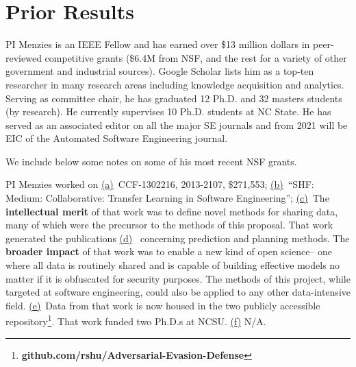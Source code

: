  \section{Prior Results}\label{sec:PriorResults}

PI Menzies is an IEEE Fellow and has earned over \$13 million dollars in peer-reviewed competitive grants (\$6.4M from NSF, and  the rest for a variety of other government and industrial sources).
Google Scholar lists him as a top-ten researcher in many research areas including knowledge acquisition and analytics. Serving as committee chair, he has graduated 12 Ph.D. and 32 masters students (by research). He currently supervises 10 Ph.D. students at NC State. He has served as an associated editor on all the major SE journals and from 2021 will be EIC of the Automated Software Engineering journal. 


 We include below some notes  on some of his most recent NSF grants.


PI Menzies worked on \underline{(a)}~CCF-1302216, 2013-2107, \$271,553; \underline{(b)}~``SHF: Medium: Collaborative: Transfer Learning in Software Engineering''; \underline{(c)}~The {\bf intellectual merit} of that work was to
define novel methods for sharing data, many of which were the precursor to the methods of this proposal.  That work generated the publications  \underline{(d)}~\cite{krishna2018bellwethers,peters2015lace2,he13,Me17,fu2016tuning,krishna2017learning,krishna2020whence} concerning prediction and planning methods.
The {\bf broader impact} of that work was to
enable a new kind of open science-- one where all data is routinely shared and is capable of building effective models no matter if it is obfuscated for security purposes.
The methods of this project, while targeted at software engineering, could also be applied to any other data-intensive field. \underline{(e)}~Data from that work is now housed in the two
publicly accessible repository\footnote{
{\bf github.com/rshu/Adversarial-Evasion-Defense}}. That work  funded two Ph.D.s at NCSU. \underline{(f)}
N/A. 



